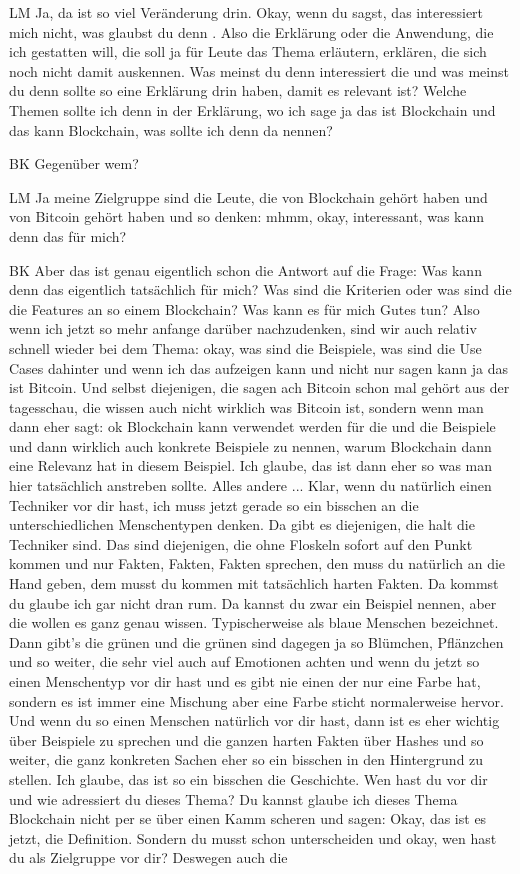 \begin{xlist}
    \item[LM] Ja, da ist so viel Veränderung drin. Okay, wenn du sagst, das interessiert mich nicht, was glaubst du denn . Also die Erklärung oder die Anwendung, die ich gestatten will, die soll ja für Leute das Thema erläutern, erklären, die sich noch nicht damit auskennen. Was meinst du denn interessiert die und was meinst du denn sollte so eine Erklärung drin haben, damit es relevant ist? Welche Themen sollte ich denn in der Erklärung, wo ich sage ja das ist Blockchain und das kann Blockchain, was sollte ich denn da nennen?
    \item[BK] Gegenüber wem?
    \item[LM] Ja meine Zielgruppe sind die Leute, die von Blockchain gehört haben und von Bitcoin gehört haben und so denken: mhmm, okay, interessant, was kann denn das für mich?
    \item[BK] Aber das ist genau eigentlich schon die Antwort auf die Frage: Was kann denn das eigentlich tatsächlich für mich? Was sind die Kriterien oder was sind die die Features an so einem Blockchain? Was kann es für mich Gutes tun? Also wenn ich jetzt so mehr anfange darüber nachzudenken, sind wir auch relativ schnell wieder bei dem Thema: okay, was sind die Beispiele, was sind die Use Cases dahinter und wenn ich das aufzeigen kann und nicht nur sagen kann ja das ist Bitcoin. Und selbst diejenigen, die sagen ach Bitcoin schon mal gehört aus der tagesschau, die wissen auch nicht wirklich was Bitcoin ist, sondern wenn man dann eher sagt: ok Blockchain kann verwendet werden für die und die Beispiele und dann wirklich auch konkrete Beispiele zu nennen, warum Blockchain dann eine Relevanz hat in diesem Beispiel. Ich glaube, das ist dann eher so was man hier tatsächlich anstreben sollte. Alles andere ... Klar, wenn du natürlich einen Techniker vor dir hast, ich muss jetzt gerade so ein bisschen an die unterschiedlichen Menschentypen denken. Da gibt es diejenigen, die halt die Techniker sind. Das sind diejenigen, die ohne Floskeln sofort auf den Punkt kommen und nur Fakten, Fakten, Fakten sprechen, den muss du natürlich an die Hand geben, dem musst du kommen mit tatsächlich harten Fakten. Da kommst du glaube ich gar nicht dran rum. Da kannst du zwar ein Beispiel nennen, aber die wollen es ganz genau wissen. Typischerweise als blaue Menschen bezeichnet. Dann gibt's die grünen und die grünen sind dagegen ja so Blümchen, Pflänzchen und so weiter, die sehr viel auch auf Emotionen achten und wenn du jetzt so einen Menschentyp vor dir hast und es gibt nie einen der nur eine Farbe hat, sondern es ist immer eine Mischung aber eine Farbe sticht normalerweise hervor. Und wenn du so einen Menschen natürlich vor dir hast, dann ist es eher wichtig über Beispiele zu sprechen und die ganzen harten Fakten über Hashes und so weiter, die ganz konkreten Sachen eher so ein bisschen in den Hintergrund zu stellen. Ich glaube, das ist so ein bisschen die Geschichte. Wen hast du vor dir und wie adressiert du dieses Thema? Du kannst glaube ich dieses Thema Blockchain nicht per se über einen Kamm scheren und sagen: Okay, das ist es jetzt, die Definition. Sondern du musst schon unterscheiden und okay, wen hast du als Zielgruppe vor dir? Deswegen auch die 
\end{xlist}
